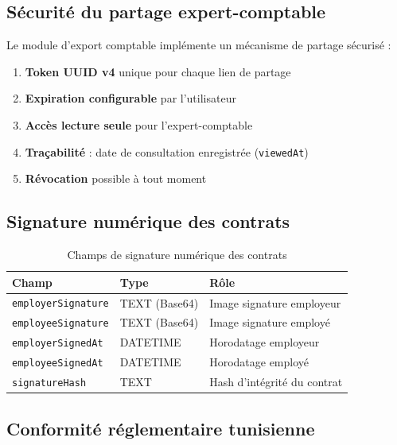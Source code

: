 \subsection{Sécurité du partage expert-comptable}

Le module d'export comptable implémente un mécanisme de partage sécurisé :
\begin{enumerate}
    \item \textbf{Token UUID v4} unique pour chaque lien de partage
    \item \textbf{Expiration configurable} par l'utilisateur
    \item \textbf{Accès lecture seule} pour l'expert-comptable
    \item \textbf{Traçabilité} : date de consultation enregistrée (\texttt{viewedAt})
    \item \textbf{Révocation} possible à tout moment
\end{enumerate}

\subsection{Signature numérique des contrats}

\begin{table}[H]
\centering
\caption{Champs de signature numérique des contrats}
\label{tab:signature}
\begin{tabular}{|l|l|l|}
\hline
\textbf{Champ} & \textbf{Type} & \textbf{Rôle} \\
\hline
\texttt{employerSignature} & TEXT (Base64) & Image signature employeur \\
\hline
\texttt{employeeSignature} & TEXT (Base64) & Image signature employé \\
\hline
\texttt{employerSignedAt} & DATETIME & Horodatage employeur \\
\hline
\texttt{employeeSignedAt} & DATETIME & Horodatage employé \\
\hline
\texttt{signatureHash} & TEXT & Hash d'intégrité du contrat \\
\hline
\end{tabular}
\end{table}

\subsection{Conformité réglementaire tunisienne}

